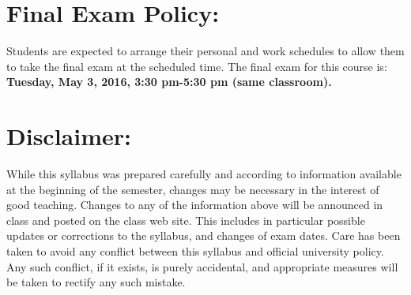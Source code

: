 \documentclass[margin]{res}
\theoremstyle{plain}
\theoremstyle{definition}
\theoremstyle{remark}
\begin{document}
\begin{resume}
\section{Final Exam Policy:} Students are expected to arrange their personal and
work schedules to allow them to take the final exam at the scheduled time.  The
final exam for this course is:\\ 
\textbf{Tuesday, May 3, 2016,  3:30 pm-5:30 pm (same classroom).}   


\section{Disclaimer:} 
While this syllabus was prepared carefully and according to information
available at the beginning of the semester, changes may be necessary in the
interest of good teaching. Changes to any of the information above will
be announced in class and posted on the class web site. This includes in
particular possible updates or corrections to the syllabus, and changes of
exam dates. Care has been taken to avoid any conflict between this syllabus and official university policy. Any such conflict, if it exists, is purely accidental, and appropriate measures will be taken to rectify any such mistake. 



\end{resume}
\end{document}
